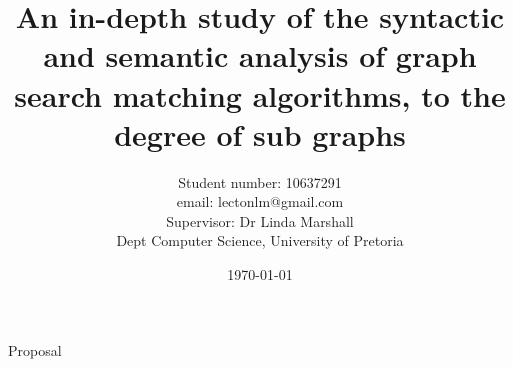 \documentclass[titlepage]{article}
\title{An in-depth study of the syntactic and semantic analysis of graph  search matching algorithms, to the degree of sub graphs}
\author{Student number: 10637291 \\
		email: lectonlm@gmail.com \\
		Supervisor: Dr Linda Marshall \\
		Dept Computer Science, University of Pretoria}
\date{\today}
\begin{document}
\maketitle

\newpage

{Proposal}
\end{document}
